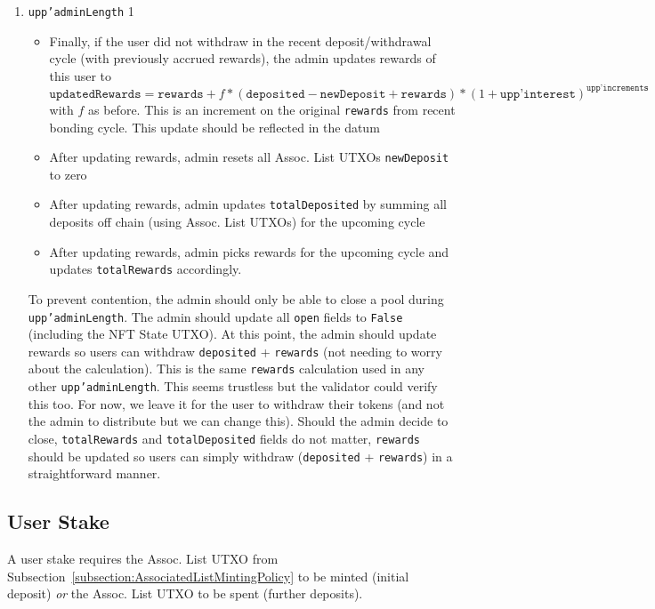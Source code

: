\documentclass[10pt, a4paper]{article}
\theoremstyle{definition}
\begin{document}
\begin{enumerate}
\item{\texttt{upp'adminLength} 1
\begin{itemize}
\item{Finally, if the user did not withdraw in the recent deposit/withdrawal cycle (with previously accrued rewards), the admin updates rewards of this user to \\ $\texttt{updatedRewards} = \texttt{rewards} + f *(\texttt{deposited} - \texttt{newDeposit} + \texttt{rewards})* (1 + \texttt{upp'interest})^\texttt{upp'increments}$ with $f$ as before. This is an increment on the original \texttt{rewards} from recent bonding cycle. This update should be reflected in the datum}
\item{After updating rewards, admin resets all Assoc. List UTXOs \texttt{newDeposit} to zero}
\item{After updating rewards, admin updates \texttt{totalDeposited} by summing all deposits off chain (using Assoc. List UTXOs) for the upcoming cycle}
\item{After updating rewards, admin picks rewards for the upcoming cycle and updates \texttt{totalRewards} accordingly.}
\end{itemize}
}
To prevent contention, the admin should only be able to close a pool during \texttt{upp'adminLength}. The admin should update all \texttt{open} fields to \texttt{False} (including the NFT State UTXO). At this point, the admin should update rewards so users can withdraw \texttt{deposited} + \texttt{rewards} (not needing to worry about the calculation). This is the same \texttt{rewards} calculation used in any other \texttt{upp'adminLength}. This seems trustless but the validator could verify this too. For now, we leave it for the user to withdraw their tokens (and not the admin to distribute but we can change this). Should the admin decide to close, \texttt{totalRewards} and \texttt{totalDeposited} fields do not matter, \texttt{rewards} should be updated so users can simply withdraw (\texttt{deposited} + \texttt{rewards}) in a straightforward manner.
\end{enumerate}

\label{section:unbondedSchema}
\subsection{User Stake}\label{subsection:userStake}
A user stake requires the Assoc. List UTXO from Subsection~\ref{subsection:AssociatedListMintingPolicy} to be minted (initial deposit) \textit{or} the Assoc. List UTXO to be spent (further deposits).
\end{document}
